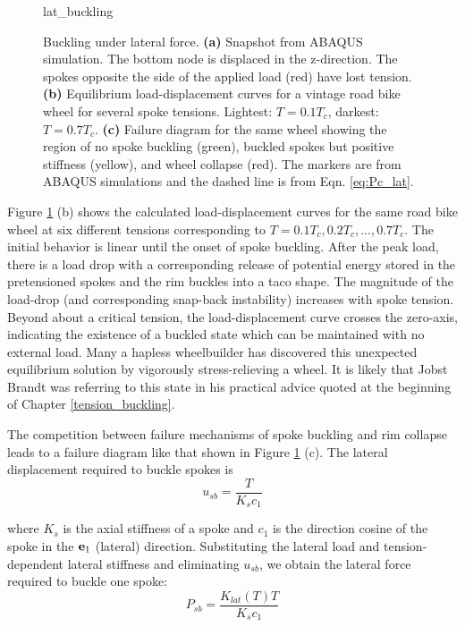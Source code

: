 \documentclass[\rootdir/thesis.tex]{subfiles}
\begin{document}
\begin{figure}
\centering
{lat_buckling} 
\caption{Buckling under lateral force. \textbf{(a)} Snapshot from ABAQUS simulation. The bottom node is displaced in the z-direction. The spokes opposite the side of the applied load (red) have lost tension. \textbf{(b)} Equilibrium load-displacement curves for a vintage road bike wheel for several spoke tensions. Lightest: $T=0.1T_c$, darkest: $T=0.7T_c$. \textbf{(c)} Failure diagram for the same wheel showing the region of no spoke buckling (green), buckled spokes but positive stiffness (yellow), and wheel collapse (red). The markers are from ABAQUS simulations and the dashed line is from Eqn. \eqref{eq:Pc_lat}.}
\label{fig:lat_buckling}
\end{figure}

Figure \ref{fig:lat_buckling} (b) shows the calculated load-displacement curves for the same road bike wheel at six different tensions corresponding to $T=0.1T_c, 0.2T_c,...,0.7T_c$. The initial behavior is linear until the onset of spoke buckling. After the peak load, there is a load drop with a corresponding release of potential energy stored in the pretensioned spokes and the rim buckles into a taco shape. The magnitude of the load-drop (and corresponding snap-back instability) increases with spoke tension. Beyond about a critical tension, the load-displacement curve crosses the zero-axis, indicating the existence of a buckled state which can be maintained with no external load. Many a hapless wheelbuilder has discovered this unexpected equilibrium solution by vigorously stress-relieving a wheel. It is likely that Jobst Brandt was referring to this state in his practical advice quoted at the beginning of Chapter \ref{tension_buckling}.

The competition between failure mechanisms of spoke buckling and rim collapse leads to a failure diagram like that shown in Figure \ref{fig:lat_buckling} (c). The lateral displacement required to buckle spokes is
\begin{equation}
u_{sb} = \frac{T}{K_s c_1}
\end{equation}

where $K_s$ is the axial stiffness of a spoke and $c_1$ is the direction cosine of the spoke in the $\mathbf{e}_1$ (lateral) direction. Substituting the lateral load and tension-dependent lateral stiffness and eliminating $u_{sb}$, we obtain the lateral force required to buckle one spoke:
\begin{equation}
\label{eq:Pc_lat}
P_{sb} = \frac{K_{lat}(T) T}{K_s c_1}
\end{equation}
\end{document}
